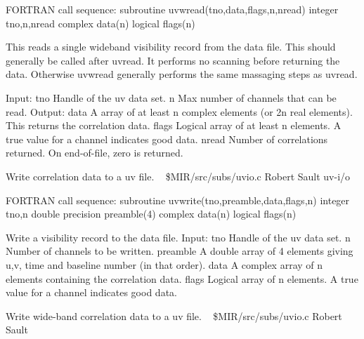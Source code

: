 \par{\tenpoint
{\eightpoint\begintt
FORTRAN call sequence:
        subroutine uvwread(tno,data,flags,n,nread)
        integer tno,n,nread
        complex data(n)
        logical flags(n)

  This reads a single wideband visibility record from the data file.
  This should generally be called after uvread. It performs no scanning
  before returning the data. Otherwise uvwread generally performs the
  same massaging steps as uvread.

  Input:
    tno         Handle of the uv data set.
    n           Max number of channels that can be read.
  Output:
    data        A array of at least n complex elements (or 2n real
                elements). This returns the correlation data.
    flags       Logical array of at least n elements. A true value for
                a channel indicates good data.
    nread       Number of correlations returned. On end-of-file, zero
                is returned.                                            
\endtt}
\par}
%
\noindent Write correlation data to a uv file.
\newline \ 
\newline {} \$MIR/src/subs/uvio.c
\newline {} Robert Sault
\newline {} uv-i/o
\par{\tenpoint
{\eightpoint\begintt
FORTRAN call sequence:
        subroutine uvwrite(tno,preamble,data,flags,n)
        integer tno,n
        double precision preamble(4)
        complex data(n)
        logical flags(n)

  Write a visibility record to the data file.
  Input:
    tno         Handle of the uv data set.
    n           Number of channels to be written.
    preamble    A double array of 4 elements giving u,v, time and
                baseline number (in that order).
    data        A complex array of n elements containing
                the correlation data.
    flags       Logical array of n elements. A true value for
                a channel indicates good data.                          
\endtt}
\par}
%
\noindent Write wide-band correlation data to a uv file.
\newline \ 
\newline {} \$MIR/src/subs/uvio.c
\newline {} Robert Sault
